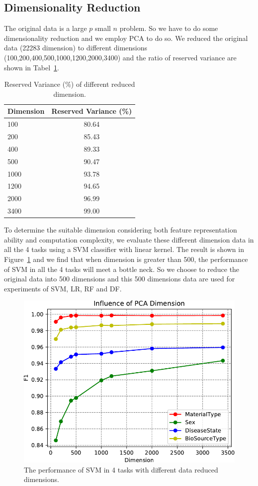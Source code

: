 \documentclass[sigconf]{acmart}
\begin{document}
	\subsection{Dimensionality Reduction}
	The original data is a large $p$ small $n$ problem. So we have to do some dimensionality reduction and we employ PCA to do so. We reduced the original data (22283 dimension) to different dimensions (100,200,400,500,1000,1200,2000,3400) and the ratio of reserved variance are shown in Tabel~\ref{tab:PCA}.
	
	\begin{table}[tbp]
		\centering
		\begin{tabular}{l|c}
			\toprule
			Dimension & Reserved Variance (\%) \\
			\midrule
			100 & 80.64 \\
			200 & 85.43 \\
			400 & 89.33 \\
			500 & 90.47 \\
			1000 & 93.78 \\
			1200 & 94.65 \\
			2000 & 96.99 \\
			3400 & 99.00 \\			
			\bottomrule	
		\end{tabular}
		\caption{ Reserved Variance (\%) of different reduced dimension. }
		\label{tab:PCA}
	\end{table}
	
	To determine the suitable dimension considering both feature representation ability and computation complexity, we evaluate these different dimension data in all the 4 tasks using a SVM classifier with linear kernel. The result is shown in Figure~\ref{fig:PCA_Dimension} and we find that when dimension is greater than 500, the performance of SVM in all the 4 tasks will meet a bottle neck. So we choose to reduce the original data into 500 dimensions and this 500 dimensions data are used for experiments of SVM, LR, RF and DF.
	
\begin{figure}[h]
\centering
\includegraphics[width=0.8\linewidth]{../figs/PCA_Dimension}
\caption{The performance of SVM in 4 tasks with different data reduced dimensions.}
\label{fig:PCA_Dimension}
\end{figure}
	
\end{document}
